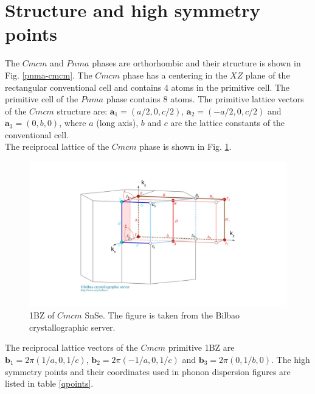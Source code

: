 \section{Structure and high symmetry points}

The $Cmcm$ and $Pnma$ phases are orthorhombic and their structure  is shown in Fig. \ref{pnma-cmcm}. The $Cmcm$ phase 
has a centering in the $XZ$ plane of the rectangular conventional cell and contains 4 atoms in the primitive cell. 
The primitive cell of the $Pnma$ phase contains $8$ atoms. The primitive lattice vectors 
of the $Cmcm$ structure are: $\mathbf{a}_{1}=(a/2,0,c/2)$, $\mathbf{a}_{2}=(-a/2,0,c/2)$ and
$\mathbf{a}_{3}=(0,b,0)$, where $a$ (long axis), $b$ and $c$ are the lattice constants of the conventional cell. \\

The reciprocal lattice of the $Cmcm$ phase is shown in Fig. \ref{1bzsnse}.
\begin{figure}[h]
\begin{center}
\includegraphics[width=\linewidth]{Figures/brillouinsnse.pdf}
\caption{1BZ of $Cmcm$ SnSe. The figure is taken from the Bilbao crystallographic server.}
\label{1bzsnse}
\end{center}
\end{figure}
The reciprocal lattice vectors of the $Cmcm$ primitive 1BZ are $\mathbf{b}_{1}=2\pi(1/a,0,1/c)$, 
$\mathbf{b}_{2}=2\pi(-1/a,0,1/c)$ and $\mathbf{b}_{3}=2\pi(0,1/b,0)$. The high symmetry points and their coordinates 
used in phonon dispersion figures are listed in table \ref{qpoints}.
